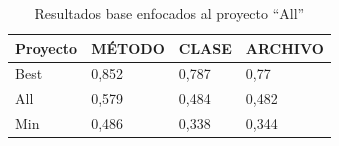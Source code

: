 \begin{table}[H]
\captionsetup{labelsep=period, labelfont=bf}
\caption{\label{table:min_max_all} Resultados base enfocados al proyecto ``All''}
\centering
\begin{tabular}{llll}
\toprule
Proyecto & MÉTODO & CLASE & ARCHIVO  \\\midrule

Best    & 0,852  & 0,787 & 0,77  \\
All     & 0,579  & 0,484 & 0,482 \\
Min     & 0,486  & 0,338 & 0,344 \\
\bottomrule
\end{tabular}

 

\end{table}
